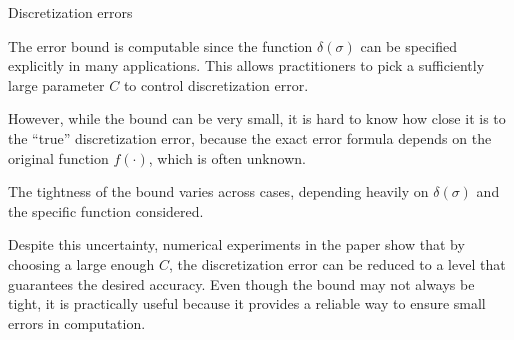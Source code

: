 \documentclass{beamer}
\begin{document}
\begin{frame}{Discretization errors}


    {\footnotesize \scriptsize
    \par The error bound is computable since the function \(\delta(\sigma)\) can be specified explicitly 
    in many applications. This allows practitioners to pick a sufficiently large parameter \(C\) to control discretization error.
    \vspace{1em}
    \par However, while the bound can be very small, it is hard to know how close it is to the ``true'' discretization error, 
    because the exact error formula depends on the original function \(f(\cdot)\), which is often unknown.
     \vspace{1em}
    \par The tightness of the bound varies across cases, depending heavily on \(\delta(\sigma)\) and the specific function considered.
     \vspace{1em}
    \par  Despite this uncertainty, numerical experiments in the paper show that by
    choosing a large enough \(C\), the discretization error can be reduced to a level that guarantees the desired accuracy. Even though the bound may not always be tight, 
    it is practically useful because it provides a reliable way to ensure small errors in computation.
    }
    
\end{frame}
%
%


    
\end{document}
